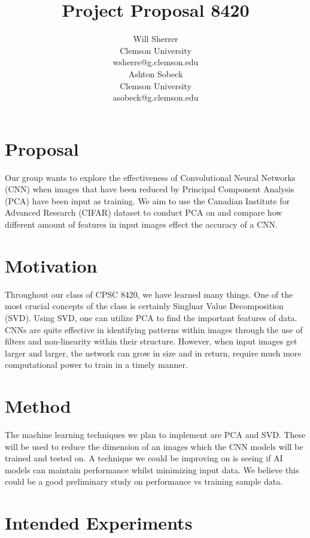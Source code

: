 \documentclass{article}
\title{Project Proposal 8420}
\author{%
	Will Sherrer \\
	Clemson University\\
	wsherre@g.clemson.edu \\
	\And Ashton Sobeck \\
	Clemson University\\
	asobeck@g.clemson.edu
}
\begin{document}
\maketitle
\section{Proposal} 

Our group wants to explore the effectiveness of Convolutional Neural Networks (CNN) 
  when  images that have been reduced by Principal Component Analysis (PCA) have 
  been input as training.  We aim to use the Canadian Institute for Advanced 
  Research (CIFAR) dataset to conduct PCA on and compare how different amount of 
  features in input images effect the accuracy of a CNN.

\section{Motivation}

Throughout our class of CPSC 8420, we have learned many things. 
One of the most crucial concepts of the class is certainly Singluar Value 
Decomposition (SVD). Using SVD, one can utilize PCA to find the important 
features of data. CNNs are quite effective in identifying patterns within 
images through the use of filters and non-linearity within their structure. 
However, when input images get larger and larger, the network can grow in 
size and in return, require much more computational power to train in a timely manner.

\section{Method}

 The machine learning techniques we plan to implement are PCA and SVD. These will be used to reduce the dimension of an images which the CNN models will be trained and tested on. A technique we could be improving on is seeing if AI models can maintain performance whilst minimizing input data. We believe this could be a good preliminary study on performance vs training sample data. 

\section{Intended Experiments}
\end{document}
